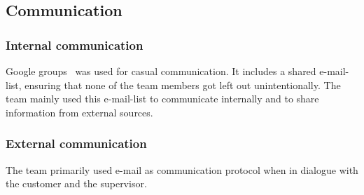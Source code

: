 \subsection{Communication}
\subsubsection{Internal communication}
Google groups~\cite{ggroups} was used for casual communication. It includes a shared e-mail-list, ensuring that none of the team members got left out unintentionally. The team mainly used this e-mail-list to communicate internally and to share information from external sources. 

\subsubsection{External communication}
The team primarily used e-mail as communication protocol when in dialogue with the customer and the supervisor.